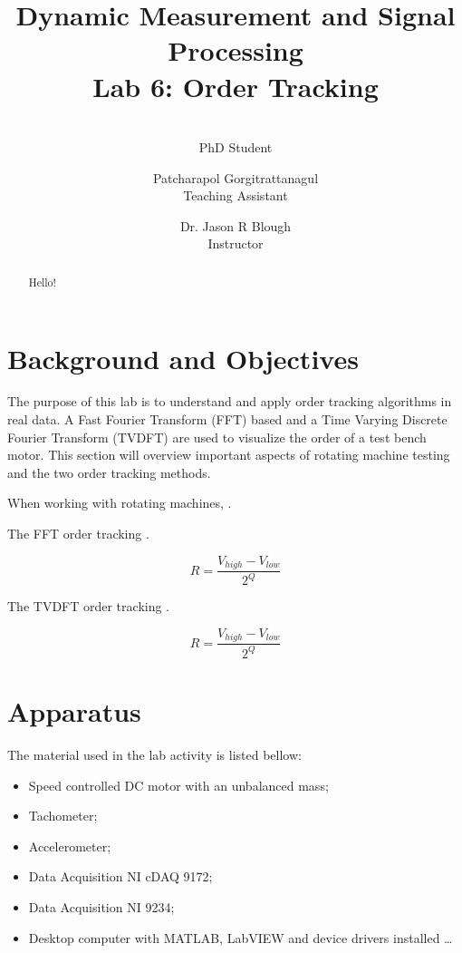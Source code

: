\documentclass[10pt,letterpaper,twocolumn]{article}
\author{\makebox[.9\textwidth]{Guilherme Aramizo Ribeiro}\\PhD Student 
\and Patcharapol Gorgitrattanagul \\Teaching Assistant \and Dr. Jason R Blough\\Instructor}
\title{Dynamic Measurement and Signal Processing \\Lab 6: Order Tracking}
\begin{document}
\maketitle

\begin{abstract}
    Hello! 
    
\end{abstract}

\section{Background and Objectives}

	The purpose of this lab is to understand and apply order tracking algorithms in real data. A Fast Fourier Transform (FFT) based and a Time Varying Discrete Fourier Transform (TVDFT) are used to visualize the order of a test bench motor. This section will overview important aspects of rotating machine testing and the two order tracking methods.
	
	When working with rotating machines, .
	
	The FFT order tracking .
	
    \begin{equation}
        R = \dfrac{V_{high} - V_{low}}{2^Q}
        \label{eq:resolution}
    \end{equation} 
	
	The TVDFT order tracking .
	
    \begin{equation}
        R = \dfrac{V_{high} - V_{low}}{2^Q}
        \label{eq:resolution}
    \end{equation} 

\section{Apparatus}
    The material used in the lab activity is listed bellow:

    \begin{itemize}
		\item Speed controlled DC motor with an unbalanced mass; 
		\item Tachometer; 
		\item Accelerometer;  
		\item Data Acquisition NI cDAQ 9172;
		\item Data Acquisition NI 9234;
		\item Desktop computer with MATLAB, LabVIEW and device drivers installed \ldots
    \end{itemize}
\end{document}
